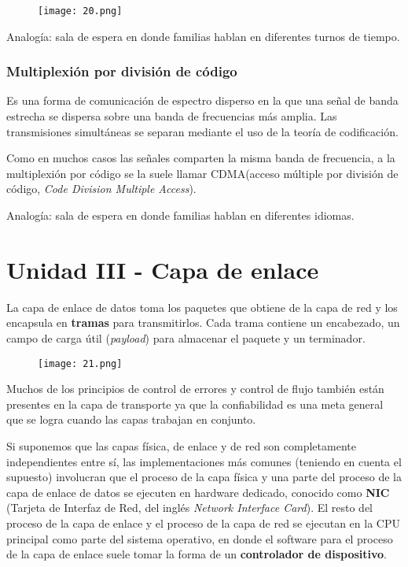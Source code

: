 \documentclass{book}
\begin{document}
	\begin{figure}[H]
		\centering
		\texttt{[image: 20.png]}
	\end{figure}
	
	\vspace{3mm}
	Analogía: sala de espera en donde familias hablan en diferentes turnos de tiempo.
	
	\subsection{Multiplexión por división de código}
	Es una forma de comunicación de espectro disperso en la que una señal de banda estrecha se dispersa sobre una banda de frecuencias más amplia. Las transmisiones simultáneas se separan mediante el uso de la teoría de codificación.
	
	\vspace{3mm}
	Como en muchos casos las señales comparten la misma banda de frecuencia, a la multiplexión por código se la suele llamar CDMA(acceso múltiple por división de código, \textit{Code Division Multiple Access}).
	
	\vspace{3mm}
	Analogía: sala de espera en donde familias hablan en diferentes idiomas.
	
	\chapter{Unidad III - Capa de enlace}
	
	La capa de enlace de datos toma los paquetes que obtiene de la capa de red y los encapsula en \textbf{tramas} para transmitirlos. Cada trama contiene un encabezado, un campo de carga útil (\textit{payload}) para almacenar el paquete y un terminador.
	
	\begin{figure}[H]
		\centering
		\texttt{[image: 21.png]}
	\end{figure}
	
	Muchos de los principios de control de errores y control de flujo también están presentes en la capa de transporte ya que la confiabilidad es una meta general que se logra cuando las capas trabajan en conjunto.
	
	\vspace{3mm}
	Si suponemos que las capas física, de enlace y de red son completamente independientes entre sí, las implementaciones más comunes (teniendo en cuenta el supuesto) involucran que el proceso de la capa física y una parte del proceso de la capa de enlace de datos se ejecuten en hardware dedicado, conocido como \textbf{NIC} (Tarjeta de Interfaz de Red, del inglés \textit{Network Interface Card}). El resto del proceso de la capa de enlace y el proceso de la capa de red se ejecutan en la CPU principal como parte del sistema operativo, en donde el software para el proceso de la capa de enlace suele tomar la forma de un \textbf{controlador de dispositivo}.
	
\end{document}
